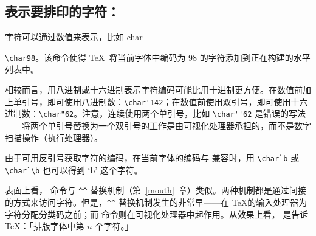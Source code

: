 \documentclass{book}
\begin{document}
\subsection{表示要排印的字符：\protect{}}

字符可以通过数值来表示，比如 \cstoidx char\par\verb-\char98-。该命令使得 \TeX\ 将当前字体中编码为 98 的字符添加到正在构建的水平列表中。

相较而言，用八进制或十六进制表示字符编码可能比用十进制更方便。在数值前加上单引号，即可使用八进制数：\verb.\char'142.；在数值前使用双引号，即可使用十六进制数：\verb.\char"62.。注意，连续使用两个单引号，比如 \verb.\char''62. 是错误的写法——将两个单引号替换为一个双引号的工作是由可视化处理器承担的，而不是数字扫描操作（执行处理器）。

由于可用反引号获取字符的编码，在当前字体的编码与 \ascii 兼容时，用 \verb.\char`b. 或 \verb.\char`\b. 也可以得到 `b' 这个字符。

表面上看， 命令与 \verb.^^. 替换机制（第~\ref{mouth}~章）类似。两种机制都是通过间接的方式来访问字符。但是，\verb.^^. 替换机制发生的非常早——在 \TeX 的输入处理器为字符分配分类码之前；而  命令则在可视化处理器中起作用。从效果上看， 是告诉 \TeX：「排版字体中第 $n$ 个字符。」
\end{document}
